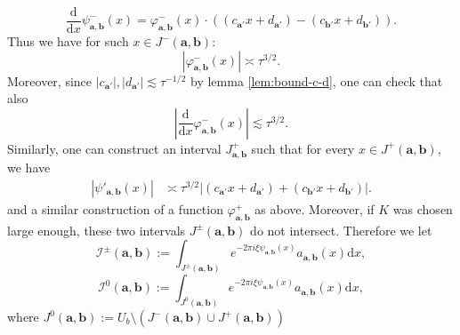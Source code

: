 \documentclass[12pt]{amsart}
\newcommand*\abs[1]{
	\left|#1\right|
}
\newcommand*\deriv{
	\mathrm{d}
}
\theoremstyle{definition}
\begin{document}
\[\frac{\deriv}{\deriv x}\psi^{-}_{\mathbf{a},\mathbf{b}}(x) = \varphi^{-}_{\mathbf{a},\mathbf{b}}(x)\cdot\left((c_{\mathbf{a}'}x + d_{\mathbf{a}'}) - (c_{\mathbf{b}'}x + d_{\mathbf{b}'})\right).\] Thus we have for such $x \in J^{-}(\mathbf{a}, \mathbf{b})$:
\[\abs{\varphi^{-}_{\mathbf{a},\mathbf{b}}(x)} \asymp \tau^{3/2}.\]
Moreover, since $\abs{c_{\mathbf{a}'}}, \abs{d_{\mathbf{a}'}} \lesssim \tau^{-1/2}$ by lemma \ref{lem:bound-c-d}, one can check that also
\[\abs{\frac{\deriv}{\deriv x}\varphi^{-}_{\mathbf{a},\mathbf{b}}(x)} \lesssim \tau^{3/2}.\]
Similarly, one can construct an interval $J_{\mathbf{a}, \mathbf{b}}^{+}$ such that for every $x \in J^+(\mathbf{a}, \mathbf{b})$, we have
\begin{align*}
\abs{\psi'_{\mathbf{a},\mathbf{b}}(x)}
&\asymp \tau^{3/2}\abs{(c_{\mathbf{a}'}x + d_{\mathbf{a}'}) + (c_{\mathbf{b}'}x + d_{\mathbf{b}'})}.
\end{align*}
and a similar construction of a function $\varphi^{+}_{\mathbf{a},\mathbf{b}}$ as above.
Moreover, if $K$ was chosen large enough, these two intervals $J^\pm(\mathbf{a},\mathbf{b})$ do not intersect. Therefore we let 
\[\mathcal{I}^\pm(\mathbf{a}, \mathbf{b}) := \int_{J^\pm(\mathbf{a},\mathbf{b})} e^{-2\pi i\xi\psi_{\mathbf{a},\mathbf{b}}(x)}a_{\mathbf{a},\mathbf{b}}(x)\deriv x,\]
\[\mathcal{I}^0(\mathbf{a}, \mathbf{b}) := \int_{J^0(\mathbf{a},\mathbf{b})} e^{-2\pi i\xi\psi_{\mathbf{a},\mathbf{b}}(x)}a_{\mathbf{a},\mathbf{b}}(x)\deriv x,\]
where $J^0(\mathbf{a},\mathbf{b}) := U_b\setminus \left(J^-(\mathbf{a},\mathbf{b}) \cup J^+(\mathbf{a},\mathbf{b})\right)$
\end{document}
